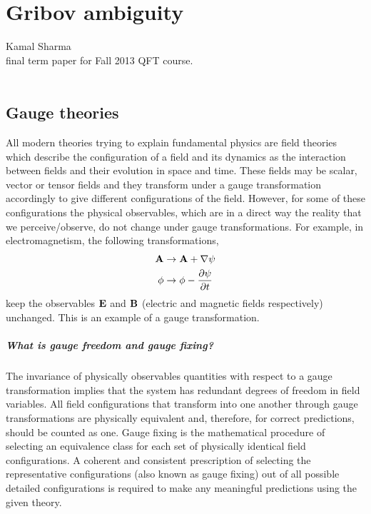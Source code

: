 
\chapter{Gribov ambiguity}
\label{c-dailyBlogKS}

\noindent
Kamal Sharma\\final term paper for Fall 2013 QFT course.
\\\\


\section{Gauge theories}
All modern theories trying to explain fundamental physics are field theories which describe the configuration of a field and its dynamics as the interaction between fields and their evolution in space and time. These fields may be scalar, vector or tensor fields and they transform under a gauge transformation accordingly to give different configurations of the field. However, for some of these configurations the physical observables, which are in a direct way the reality that we perceive/observe, do not change under gauge transformations. For example, in electromagnetism, the following transformations,
\begin{subequations}\begin{align}
 \bold{A} &\rightarrow \bold{A} + \nabla \psi  \\
 \phi &\rightarrow \phi - \frac{\partial \psi}{\partial t}\end{align} \end{subequations}
keep the observables $\bold{E}$ and $\bold{B}$ (electric and magnetic
fields respectively) unchanged. This is an example of a gauge
transformation.

\paragraph{What is gauge freedom and gauge fixing?}
The invariance of physically observables quantities with respect to a
gauge transformation implies that the system has redundant degrees of
freedom in field variables. All field configurations that transform into
one another through gauge transformations are physically equivalent and,
therefore, for correct predictions, should be counted as one. Gauge
fixing is the mathematical procedure of selecting an equivalence class
for each set of physically identical field configurations. A coherent and
consistent prescription of selecting the representative configurations
(also known as gauge fixing) out of all possible detailed configurations
is required to make any meaningful predictions using the given theory.



